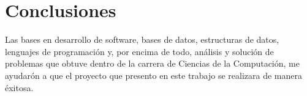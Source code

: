 \chapter{Conclusiones}
\label{cap:conclusiones}

Las bases en desarrollo de software, bases de datos, estructuras de datos,
lenguajes de programación y, por encima de todo, análisis y solución de
problemas que obtuve dentro de la carrera de Ciencias de la Computación, me
ayudarón a que el proyecto que presento en este trabajo se realizara de manera
éxitosa.

\cleardoublepage


